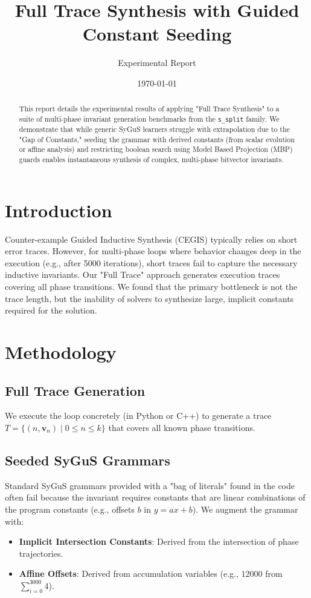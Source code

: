 \documentclass{article}
\title{Full Trace Synthesis with Guided Constant Seeding}
\author{Experimental Report}
\date{\today}
\begin{document}
\maketitle

\begin{abstract}
This report details the experimental results of applying "Full Trace Synthesis" to a suite of multi-phase invariant generation benchmarks from the \texttt{s\_split} family. We demonstrate that while generic SyGuS learners struggle with extrapolation due to the "Gap of Constants," seeding the grammar with derived constants (from scalar evolution or affine analysis) and restricting boolean search using Model Based Projection (MBP) guards enables instantaneous synthesis of complex, multi-phase bitvector invariants.
\end{abstract}

\section{Introduction}
Counter-example Guided Inductive Synthesis (CEGIS) typically relies on short error traces. However, for multi-phase loops where behavior changes deep in the execution (e.g., after 5000 iterations), short traces fail to capture the necessary inductive invariants. Our "Full Trace" approach generates execution traces covering all phase transitions. We found that the primary bottleneck is not the trace length, but the inability of solvers to synthesize large, implicit constants required for the solution.

\section{Methodology}
\subsection{Full Trace Generation}
We execute the loop concretely (in Python or C++) to generate a trace $T = \{ (n, \mathbf{v}_n) \mid 0 \le n \le k \}$ that covers all known phase transitions.

\subsection{Seeded SyGuS Grammars}
Standard SyGuS grammars provided with a "bag of literals" found in the code often fail because the invariant requires constants that are linear combinations of the program constants (e.g., offsets $b$ in $y = ax + b$). We augment the grammar with:
\begin{itemize}
    \item \textbf{Implicit Intersection Constants}: Derived from the intersection of phase trajectories.
    \item \textbf{Affine Offsets}: Derived from accumulation variables (e.g., $12000$ from $\sum_{i=0}^{3000} 4$).
\end{itemize}
\end{document}
